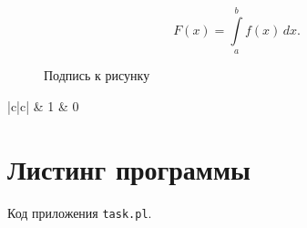 \documentclass[bachelor, och, pract]{SCWorks}
\begin{document}
\begin{equation}
  F(x)=\int\limits_a^bf(x)\,dx.
\end{equation}


\begin{figure}[!ht]
	\centering
	\caption{\label{fig:f3}%
	Подпись к рисунку}
\end{figure}


\begin{table}[!ht]
\caption{}
\begin{tabular}{|c|c|}
   & 1\cr
   & 0\cr
  \hline
\end{tabular}
\end{table}


\section{Листинг программы}\label{pril-1}
Код приложения \verb"task.pl".
\end{document}
